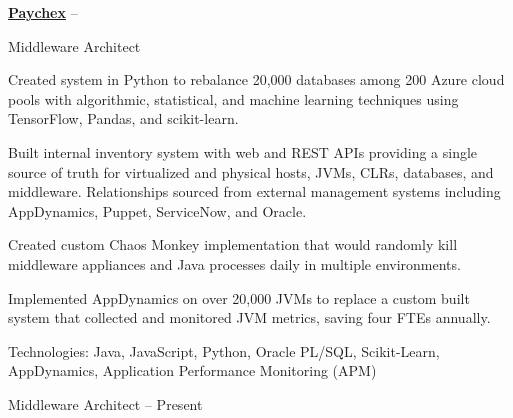 \documentclass[letterpaper,MMMMyyyy,nonstopmode]{simpleresumecv}
\newif\ifLOCATION
\begin{document}
\begin{Body}
\begin{Detail}
\end{Detail}

\BigGap

\Entry
\href{http://www.paychex.com}
{\textbf{Paychex}}
\hfill
{} -- 

Middleware Architect %
\ifLOCATION
\hfill
Rochester, New York
\fi

\begin{Detail}
\iffalse
At Paychex I worked with cross-functional teams to build: an inventory system to track hosts, managed VMs, databases, and middleware appliances; machine learning systems to efficiently repack databases and to predict system utilization based on user metrics; a ground-up implementation of the Netflix Chaos Monkey; implemented AppDynamics on over 20,000 JVMs; and a system to collect and monitor JVM metrics and send alerts via SNMP and SMTP.
\fi

\BulletItem
Created system in Python to rebalance 20,000 databases among 200 Azure cloud pools with algorithmic, statistical, and machine learning techniques using TensorFlow, Pandas, and scikit-learn.

\BulletItem
Built internal inventory system with web and REST APIs providing a single source of truth for virtualized and physical hosts, JVMs, CLRs, databases, and middleware. Relationships sourced from external management systems including AppDynamics, Puppet, ServiceNow, and Oracle.

\BulletItem
Created custom Chaos Monkey implementation that would randomly kill middleware appliances and Java processes daily in multiple environments.

\BulletItem
Implemented AppDynamics on over 20,000 JVMs to replace a custom built system that collected and monitored JVM metrics, saving four FTEs annually.

\Gap
Technologies: Java, JavaScript, Python, Oracle PL/SQL, Scikit-Learn, AppDynamics, Application Performance Monitoring (APM)
\end{Detail}

\BigGap

\iffalse %
\Entry
\href{http://www.paychex.com/}
{\textbf{Paychex}}
\ifLOCATION
\hfill 
Rochester, New York
\fi

Middleware Architect
\hfill
{} --
Present


\end{Body}
\end{document}
